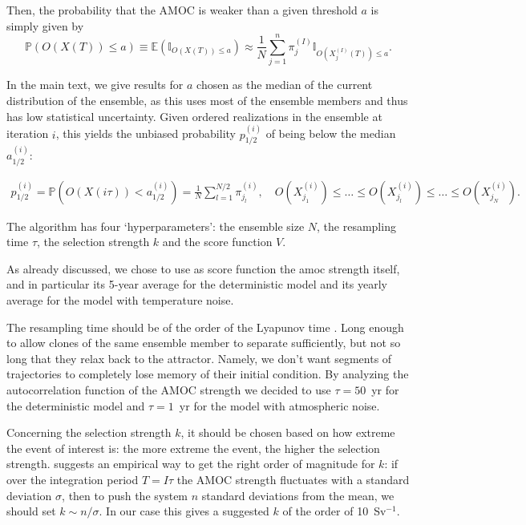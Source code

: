 Then, the probability that the AMOC is weaker than a given threshold $a$ is simply given by
\begin{equation}\label{eq:veros:unbiased-probabilities}
    \mathbb{P} (O(X(T)) \leq a) \equiv \mathbb{E} \left( \mathbb{I}_{O(X(T)) \leq a} \right) \approx \frac{1}{N} \sum_{j=1}^{n} \pi_j^{(I)} \mathbb{I}_{O(X_j^{(I)}(T)) \leq a} .
\end{equation}

In the main text, we give results for $a$ chosen as the median of the current distribution of the ensemble, as this uses most of the ensemble members and thus has low statistical uncertainty. Given ordered realizations in the ensemble at iteration $i$, this yields the unbiased probability $p_{1/2}^{(i)}$ of being below the median $a^{(i)}_{1/2}$:

\begin{gather}\label{eq:veros:p0.5}
        p_{1/2}^{(i)} = \mathbb{P}(O(X(i\tau)) < a^{(i)}_{1/2}) = \frac{1}{N} \sum_{l=1}^{N/2} \pi_{j_l}^{(i)}, \quad O(X_{j_1}^{(i)}) \leq \ldots \leq O(X_{j_{l}}^{(i)}) \leq \ldots \leq O(X_{j_{N}}^{(i)}) .
\end{gather}

The algorithm has four `hyperparameters': the ensemble size $N$, the resampling time $\tau$, the selection strength $k$ and the score function $V$.

As already discussed, we chose to use as score function the amoc strength itself, and in particular its 5-year average for the deterministic model and its yearly average for the model with temperature noise.

The resampling time should be of the order of the Lyapunov time \cite{WOU16}.
Long enough to allow clones of the same ensemble member to separate sufficiently, but not so long that they relax back to the attractor. Namely, we don't want segments of trajectories to completely lose memory of their initial condition. By analyzing the autocorrelation function of the AMOC strength we decided to use $\tau = 50$~yr for the deterministic model and $\tau = 1$~yr for the model with atmospheric noise.

Concerning the selection strength $k$, it should be chosen based on how extreme the event of interest is: the more extreme the event, the higher the selection strength. \cite{PRI24} suggests an empirical way to get the right order of magnitude for $k$: if over the integration period $T = I\tau$ the AMOC strength fluctuates with a standard deviation $\sigma$, then to push the system $n$ standard deviations from the mean, we should set $k \sim n/\sigma$. In our case this gives a suggested $k$ of the order of 10~Sv$^{-1}$.

